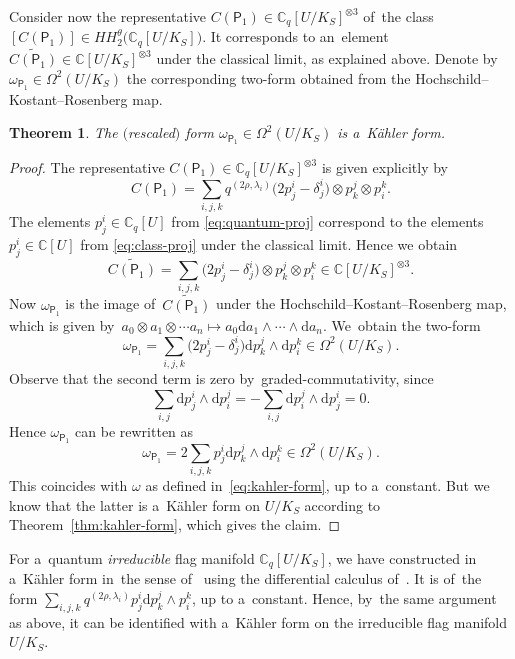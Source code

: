 \documentclass[10pt,a4paper]{amsart}
\numberwithin{equation}{section}
\newtheorem{Theorem}{Theorem}[section]
\newcommand{\CU}{\mathbb{C}[U]}
\newcommand{\CqU}{\mathbb{C}_q[U]}
\newcommand{\Cqflag}{\mathbb{C}_q[U / K_S]}
\newcommand{\diff}{\mathrm{d}}
\newcommand{\bbC}{\mathbb{C}}
\newcommand{\proj}{\mathsf{P}}
\newcommand{\kafo}{\omega}
\begin{document}
Consider now the representative $C(\proj_1) \in \Cqflag^{\otimes 3}$ of~the class $[C(\proj_1)] \in HH^\theta_2\big(\Cqflag\big)$.
It corresponds to an~element $\widetilde{C(\proj_1)} \in \bbC[U / K_S]^{\otimes 3}$ under the classical limit, as explained above.
Denote by~$\omega_{\proj_1} \in \Omega^2(U / K_S)$ the corresponding two-form obtained from the Hoch\-schild--Kostant--Rosenberg map.

\begin{Theorem}
The $($rescaled$)$ form $\omega_{\proj_1} \in \Omega^2(U / K_S)$ is a~K\"ahler form.
\end{Theorem}

\begin{proof}
The representative $C(\proj_1) \in \Cqflag^{\otimes 3}$ is given explicitly by
\[
C(\proj_1) = \sum_{i, j, k} q^{(2 \rho, \lambda_i)} \big(2 p^i_j - \delta^i_j\big) \otimes p^j_k \otimes p^k_i.
\]
The elements $p^i_j \in \CqU$ from \eqref{eq:quantum-proj} correspond to the elements $p^i_j \in \CU$ from \eqref{eq:class-proj} under the classical limit.
Hence we obtain
\[
\widetilde{C(\proj_1)} = \sum_{i, j, k} \big(2 p^i_j - \delta^i_j\big) \otimes p^j_k \otimes p^k_i \in \bbC[U / K_S]^{\otimes 3}.
\]
Now $\omega_{\proj_1}$ is the image of~$\widetilde{C(\proj_1)}$ under the Hoch\-schild--Kostant--Rosenberg map, which is given by~$a_0 \otimes a_1 \otimes \cdots a_n \mapsto a_0 \diff a_1 \wedge \cdots \wedge \diff a_n$. We~obtain the two-form
\[
\omega_{\proj_1} = \sum_{i, j, k} \big(2 p^i_j - \delta^i_j\big) \diff p^j_k \wedge \diff p^k_i \in \Omega^2(U / K_S).
\]
Observe that the second term is zero by~graded-commutativity, since
\[
\sum_{i, j} \diff p^i_j \wedge \diff p^j_i = - \sum_{i, j} \diff p^j_i \wedge \diff p^i_j = 0.
\]
Hence $\omega_{\proj_1}$ can be rewritten as
\[
\omega_{\proj_1} = 2 \sum_{i, j, k} p^i_j \diff p^j_k \wedge \diff p^k_i \in \Omega^2(U / K_S).
\]
This coincides with $\kafo$ as defined in~\eqref{eq:kahler-form}, up to a~constant.
But we know that the latter is a~K\"ahler form on $U / K_S$ according to Theorem~\ref{thm:kahler-form}, which gives the claim.
\end{proof}

\begin{Remark}
For a~quantum \emph{irreducible} flag manifold $\Cqflag$, we have constructed in~\cite{mat-kahler} a~K\"ahler form in~the sense of~\cite{obu17} using the differential calculus of~\cite{heko06}.
It is of~the form $\sum_{i, j, k} q^{(2 \rho, \lambda_i)} p^i_j \diff p^j_k \wedge p^k_i$, up to a~constant.
Hence, by~the same argument as above, it can be identified with a~K\"ahler form on the irreducible flag manifold $U / K_S$.
\end{Remark}
\end{document}
